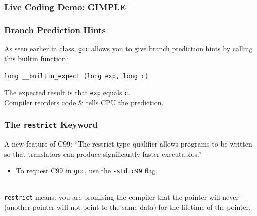 \documentclass[aspectratio=43]{beamer}
\newenvironment{changemargin}[1]{%
  \begin{list}{}{%
    \setlength{\topsep}{0pt}%
    \setlength{\leftmargin}{#1}%
    \setlength{\rightmargin}{1em}
    \setlength{\listparindent}{\parindent}%
    \setlength{\itemindent}{\parindent}%
    \setlength{\parsep}{\parskip}%
  }%
  \item[]}{\end{list}}
\begin{document}
\begin{frame}
  \frametitle{Live Coding Demo: GIMPLE}
\end{frame}


\begin{frame}[fragile]
  \frametitle{Branch Prediction Hints}

  \begin{changemargin}{1.5cm}
  As seen earlier in class, {\tt gcc} allows you to give branch
  prediction hints by calling this builtin function:

  \begin{center}
    \verb+long __builtin_expect (long exp, long c)+
  \end{center}

  The expected result is that {\tt exp} equals {\tt c}.\\[1em]
  Compiler reorders code \& tells CPU the prediction.
  
  \end{changemargin}
\end{frame}

\begin{frame}
  \frametitle{The {\tt restrict} Keyword}

   \begin{changemargin}{2.5cm}
   A new feature of C99: ``The restrict type qualifier allows programs to
      be written so that translators can produce significantly faster
      executables.''
  \begin{itemize}
    \item To request C99 in {\tt gcc}, use the {\tt -std=c99} flag.
  \end{itemize}
~\\
   {\tt restrict} means: you are promising the
      compiler that the pointer will never  (another pointer
      will not point to the same data) for the lifetime of the pointer.
  \end{changemargin}

\end{frame}
\end{document}
